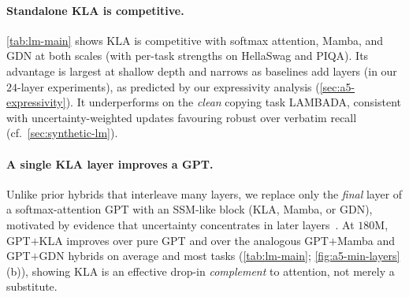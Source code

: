 \documentclass{article}
\begin{document}
\paragraph{Standalone \textsc{KLA} is competitive.}
\cref{tab:lm-main} shows \textsc{KLA} is competitive with softmax attention, Mamba, and GDN at both scales (with per-task strengths on HellaSwag and PIQA). Its advantage is largest at shallow depth and narrows as baselines add layers (in our $24$-layer experiments), as predicted by our expressivity analysis (\cref{sec:a5-expressivity}). It underperforms on the \emph{clean} copying task LAMBADA, consistent with uncertainty-weighted updates favouring robust over verbatim recall (cf.\ \cref{sec:synthetic-lm}).

\paragraph{A single \textsc{KLA} layer improves a GPT.}
Unlike prior hybrids that interleave many layers, we replace only the \emph{final} layer of a softmax-attention GPT with an SSM-like block (\textsc{KLA}, Mamba, or GDN), motivated by evidence that uncertainty concentrates in later layers~\citep{agarwal2025bayesian}. At $180$M, GPT$+$\textsc{KLA} improves over pure GPT and over the analogous GPT$+$Mamba and GPT$+$GDN hybrids on average and most tasks (\cref{tab:lm-main}; \cref{fig:a5-min-layers}(b)), showing \textsc{KLA} is an effective drop-in \emph{complement} to attention, not merely a substitute.

\end{document}
